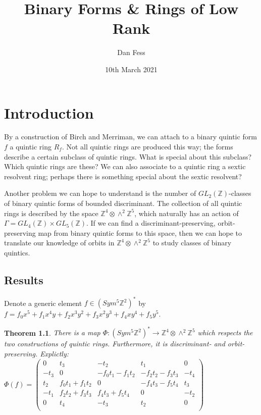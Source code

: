 \documentclass{report}
\begin{document}
\title{Binary Forms \& Rings of Low Rank}
\author{Dan Fess}
\date{10th March 2021}
\maketitle

\newtheorem{theorem}{Theorem}
\newtheorem{lemma}{Lemma}[section]
\newtheorem{prop}[lemma]{Proposition}
\newtheorem{corollary}[lemma]{Corollary}
\newtheorem{conjecture}{Conjecture}
\newtheorem{definition}[lemma]{Definition}

\chapter{Introduction}

By a construction of Birch and Merriman, we can attach to a binary quintic form $f$ a quintic ring $R_f$.  Not all quintic rings are produced this way; the forms describe a certain subclass of quintic rings.  What is special about this subclass?  Which quintic rings are these?  We can also associate to a quintic ring a sextic resolvent ring; perhaps there is something special about the sextic resolvent?

Another problem we can hope to understand is the number of $GL_2(\mathbb{Z})$-classes of binary quintic forms of bounded discriminant.  The collection of all quintic rings is described by the space $\mathbb{Z}^4 \otimes \wedge^2 \mathbb{Z}^5$, which naturally has an action of $\Gamma = GL_4(\mathbb{Z}) \times GL_5(\mathbb{Z})$.  If we can find a discriminant-preserving, orbit-preserving map from binary quintic forms to this space, then we can hope to translate our knowledge of orbits in $\mathbb{Z}^4 \otimes \wedge^2 \mathbb{Z}^5$ to study classes of binary quintics.

\section{Results}

Denote a generic element $f \in (Sym^5 \mathbb{Z}^2)^*$ by $f = f_0 x^5 + f_1 x^4 y + f_2 x^3 y^2 + f_3 x^2 y^3 + f_4 x y^4 + f_5 y^5$.

\begin{theorem}
There is a map $\Phi : (Sym^5 \mathbb{Z}^2)^* \to \mathbb{Z}^4 \otimes \wedge^2 \mathbb{Z}^5$ which respects the two constructions of quintic rings.  Furthermore, it is discriminant- and orbit-preserving.  Explictly:\\

$\Phi(f) = \begin{pmatrix}
0 & t_3 & - t_2 & t_1 & 0\\
- t_3 & 0 & -  f_0 t_1 -  f_1 t_2 & -  f_2 t_2 -  f_3 t_3 & - t_4\\
t_2 &  f_0 t_1 +  f_1 t_2 & 0 & -  f_4 t_3 -  f_5 t_4 & t_3\\
- t_1 &  f_2 t_2 +  f_3 t_3 &  f_4 t_3 +  f_5 t_4 & 0 & - t_2\\
0 & t_4 & - t_3 & t_2 & 0\\
\end{pmatrix}$\\
\end{theorem}
\end{document}
